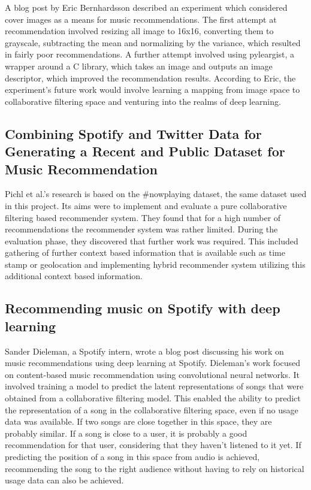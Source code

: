 \documentclass{article} %
\begin{document}
A blog post by Eric Bernhardsson \cite{bernhardsson2014music} described an experiment which considered cover images as a means for music recommendations. The first attempt at recommendation involved resizing all image to 16x16, converting them to grayscale, subtracting the mean and normalizing by the variance, which resulted in fairly poor recommendations. A further attempt involved using pyleargist, a wrapper around a C library, which takes an image and outputs an image descriptor, which improved the recommendation results. According to Eric, the experiment's future work would involve learning a mapping from image space to collaborative filtering space and venturing into the realms of deep learning.

\subsection{Combining Spotify and Twitter Data for Generating a Recent and Public Dataset for Music Recommendation}

Pichl et al.'s research \cite{pichl2014combining} is based on the \#nowplaying dataset, the same dataset used in this project. Its aims were to implement and evaluate a pure collaborative filtering based recommender system. They found that for a high number of recommendations the recommender system was rather limited. During the evaluation phase, they discovered that further work was required. This included gathering of further context based information that is available such as time stamp or geolocation and implementing hybrid recommender system utilizing this additional context based information.

\subsection{Recommending music on Spotify with deep learning}

Sander Dieleman, a Spotify intern, wrote a blog post \cite{dieleman2014recommending} discussing his work on music recommendations using deep learning at Spotify. Dieleman's work focused on content-based music recommendation using convolutional neural networks. It involved training a model to predict the latent representations of songs that were obtained from a collaborative filtering model. This enabled the ability to predict the representation of a song in the collaborative filtering space, even if no usage data was available. If two songs are close together in this space, they are probably similar. If a song is close to a user, it is probably a good recommendation for that user, considering that they haven't listened to it yet. If predicting the position of a song in this space from audio is achieved, recommending the song to the right audience without having to rely on historical usage data can also be achieved.
\end{document}
